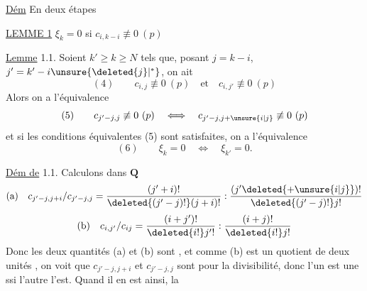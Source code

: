 \uline{Dém} En deux étapes

\uline{LEMME 1} $\xi_k=0$ si  $c_{i,k-i}\not\equiv0\ (p)$

\uline{Lemme} 1.1. Soient  $k'\geq k\geq N$ tels que, posant $j=k-i$, $j'=k'-i\unsure{\deleted{j}|^\ast}$, on ait
\[
(4)\qquad c_{i,j}\not\equiv0\ (p)\quad\text{et}\quad c_{i,j'}\not\equiv0\ (p)
\]
Alors on a l'équivalence
\[
(5)\qquad c_{j'-j,j}\not\equiv0\ (p)\quad\Longleftrightarrow\quad c_{j'-j,j+\unsure{i|j}}\not\equiv0\ (p)
\]
et si les conditions équivalentes (5) sont satisfaites, on a l'équivalence
\[
(6)\qquad\xi_k=0\quad\Longleftrightarrow\quad\xi_{k'}=0.
\]

\uline{Dém de} 1.1. Calculons dans $\mathbf Q$
\[
\text{(a)}\quad c_{j'-j,j+i}/c_{j'-j,j}=\frac{(j'+i)!}{\deleted{(j'-j)!}(j+i)!}:\frac{(j'\deleted{+\unsure{i|j}})!}{\deleted{(j'-j)!}j!}
\]
\margin{$\unsure{\alpha\ //}$}
\[
\text{(b)}\quad c_{i,j'}/c_{ij}=\frac{(i+j')!}{\deleted{i!}j'!}:\frac{(i+j)!}{\deleted{i!}j!}
\]
Donc les deux quantités (a) et (b) sont , et comme (b) est un quotient de deux unités  , on voit que $c_{j'-j,j+i}$ et $c_{j'-j,j}$ sont  pour la divisibilité, donc l'un est une  ssi l'autre l'est. Quand il en est ainsi, la
